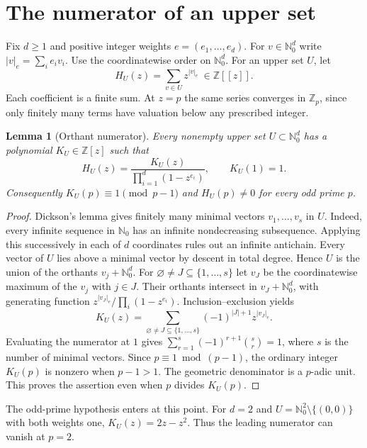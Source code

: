 \documentclass[11pt]{article}
\newtheorem{lemma}[theorem]{Lemma}
\newcommand{\Z}{\mathbb Z}
\newcommand{\N}{\mathbb N_0}
\begin{document}
\section{The numerator of an upper set}

Fix $d\ge1$ and positive integer weights $e=(e_1,\ldots,e_d)$. For
$v\in\N^d$ write $|v|_e=\sum_i e_i v_i$. Use the coordinatewise order on $\N^d$.
For an upper set $U$, let
\[
 H_U(z)=\sum_{v\in U}z^{|v|_e}\ \in\Z[[z]].
\]
Each coefficient is a finite sum. At $z=p$ the same series converges in $\Z_p$,
since only finitely many terms have valuation below any prescribed integer.

\begin{lemma}[Orthant numerator]\label{lem:numerator}
Every nonempty upper set $U\subset\N^d$ has a polynomial $K_U\in\Z[z]$ such that
\[
 H_U(z)=\frac{K_U(z)}{\prod_{i=1}^d(1-z^{e_i})},\qquad K_U(1)=1.
\]
Consequently $K_U(p)\equiv1\pmod{p-1}$ and $H_U(p)\ne0$ for every odd prime $p$.
\end{lemma}
\begin{proof}
Dickson's lemma gives finitely many minimal vectors $v_1,\ldots,v_s$ in $U$.
Indeed, every infinite sequence in $\N$ has an infinite nondecreasing subsequence.
Applying this successively in each of $d$ coordinates rules out an infinite antichain.
Every vector of $U$ lies above a minimal vector by descent in total degree.
Hence $U$ is the union of the orthants $v_j+\N^d$.
For $\varnothing\ne J\subseteq\{1,\ldots,s\}$ let $v_J$ be the coordinatewise maximum
of the $v_j$ with $j\in J$. Their orthants intersect in $v_J+\N^d$, with generating
function $z^{|v_J|_e}/\prod_i(1-z^{e_i})$. Inclusion--exclusion yields
\begin{equation}\label{eq:K}
 K_U(z)=\sum_{\varnothing\ne J\subseteq\{1,\ldots,s\}}
             (-1)^{|J|+1}z^{|v_J|_e}.
\end{equation}
Evaluating the numerator at $1$ gives $\sum_{r=1}^{s}(-1)^{r+1}\binom{s}{r}=1$, where $s$ is the number of minimal vectors. Since $p\equiv1\bmod(p-1)$,
the ordinary integer $K_U(p)$ is nonzero when $p-1>1$. The geometric denominator
is a $p$-adic unit. This proves the assertion even when $p$ divides $K_U(p)$.
\end{proof}

The odd-prime hypothesis enters at this point. For $d=2$ and
$U=\N^2\setminus\{(0,0)\}$ with both weights one, $K_U(z)=2z-z^2$.
Thus the leading numerator can vanish at $p=2$.
\end{document}
